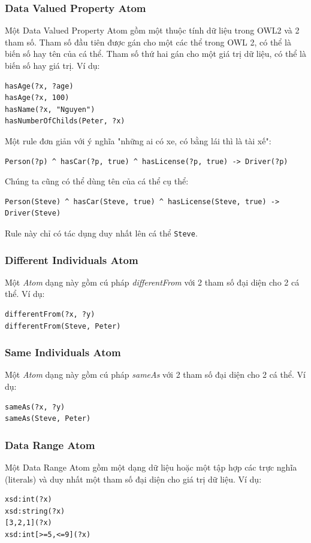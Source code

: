 \subsubsection{Data Valued Property Atom}
Một Data Valued Property Atom gồm một thuộc tính dữ liệu trong OWL2 và 2 tham số. Tham số đầu tiên được gán cho một các thể trong OWL 2, có thể là biến số hay tên của cá thể. Tham số thứ hai gán cho một giá trị dữ liệu, có thể là biến số hay giá trị. Ví dụ:
\begin{verbatim}
hasAge(?x, ?age)
hasAge(?x, 100)
hasName(?x, "Nguyen")
hasNumberOfChilds(Peter, ?x)
\end{verbatim}
Một rule đơn giản với ý nghĩa "những ai có xe, có bằng lái thì là tài xế":
\begin{verbatim}
Person(?p) ^ hasCar(?p, true) ^ hasLicense(?p, true) -> Driver(?p)
\end{verbatim}
Chúng ta cũng có thể dùng tên của cá thể cụ thể:
\begin{verbatim}
Person(Steve) ^ hasCar(Steve, true) ^ hasLicense(Steve, true) -> Driver(Steve)
\end{verbatim}
Rule này chỉ có tác dụng duy nhất lên cá thể \verb|Steve|.

\subsubsection{Different Individuals Atom}
Một \textit{Atom} dạng này gồm cú pháp \textit{differentFrom} với 2 tham số đại diện cho 2 cá thể. Ví dụ:
\begin{verbatim}
differentFrom(?x, ?y)
differentFrom(Steve, Peter)
\end{verbatim}

\subsubsection{Same Individuals Atom}
Một \textit{Atom} dạng này gồm cú pháp \textit{sameAs} với 2 tham số đại diện cho 2 cá thể. Ví dụ:
\begin{verbatim}
sameAs(?x, ?y)
sameAs(Steve, Peter)
\end{verbatim}

\subsubsection{Data Range Atom}
Một Data Range Atom gồm một dạng dữ liệu hoặc một tập hợp các trực nghĩa (literals) và duy nhất một tham số đại diện cho giá trị dữ liệu. Ví dụ:
\begin{verbatim}
xsd:int(?x)
xsd:string(?x)
[3,2,1](?x)
xsd:int[>=5,<=9](?x)
\end{verbatim}

